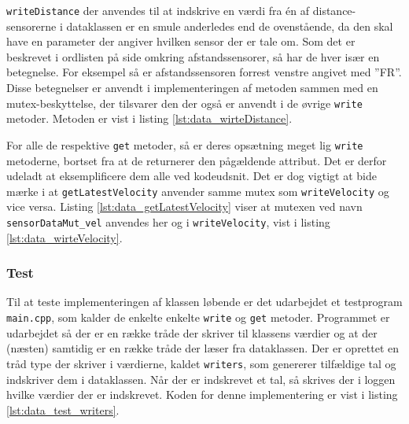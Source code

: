 \texttt{writeDistance} der anvendes til at indskrive en værdi fra én af distance-sensorerne i dataklassen er en smule anderledes end de ovenstående, da den skal have en parameter der angiver hvilken sensor der er tale om. Som det er beskrevet i ordlisten på side \pageref{sec:ordforklaring} omkring afstandssensorer, så har de hver især en betegnelse. For eksempel så er afstandssensoren forrest venstre angivet med ''FR''. Disse betegnelser er anvendt i implementeringen af metoden sammen med en mutex-beskyttelse, der tilsvarer den der også er anvendt i de øvrige \texttt{write} metoder. Metoden er vist i listing \ref{lst:data_wirteDistance}.



For alle de respektive \texttt{get} metoder, så er deres opsætning meget lig \texttt{write} metoderne, bortset fra at de returnerer den pågældende attribut. Det er derfor udeladt at eksemplificere dem alle ved kodeudsnit. Det er dog vigtigt at bide mærke i at \texttt{getLatestVelocity} anvender samme mutex som \texttt{writeVelocity} og vice versa. Listing \ref{lst:data_getLatestVelocity} viser at mutexen ved navn \texttt{sensorDataMut\_vel} anvendes her og i \texttt{writeVelocity}, vist i listing \ref{lst:data_wirteVelocity}.



\clearpage

\subsubsection{Test}
Til at teste implementeringen af klassen løbende er det udarbejdet et testprogram \texttt{main.cpp}, som kalder de enkelte enkelte  \texttt{write} og \texttt{get} metoder. Programmet er udarbejdet så der er en række tråde der skriver til klassens værdier og at der (næsten) samtidig er en række tråde der læser fra dataklassen. Der er oprettet en tråd type der skriver i værdierne, kaldet \texttt{writers}, som genererer tilfældige tal og indskriver dem i dataklassen. Når der er indskrevet et tal, så skrives der i loggen hvilke værdier der er indskrevet. Koden for denne implementering er vist i listing \ref{lst:data_test_writers}.

